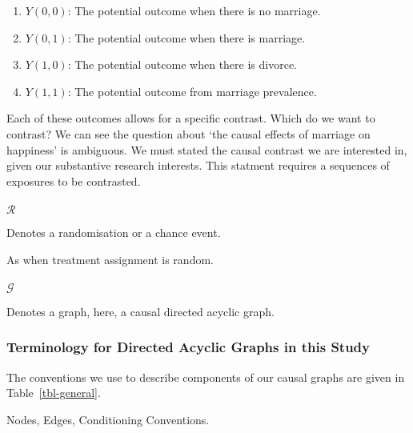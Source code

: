 \documentclass[
  single column]{article}
\makeatletter
\let\oldparagraph\paragraph
\renewcommand{\paragraph}{
    \@ifstar
      \xxxParagraphStar
      \xxxParagraphNoStar
  }
\newcommand{\xxxParagraphStar}[1]{\oldparagraph*{#1}\mbox{}}
\newcommand{\xxxParagraphNoStar}[1]{\oldparagraph{#1}\mbox{}}
\providecommand{\tightlist}{%
  \setlength{\itemsep}{0pt}\setlength{\parskip}{0pt}}\usepackage{longtable,booktabs,array}
\makeatother
\begin{document}
\begin{enumerate}
\def\labelenumi{\arabic{enumi}.}
\tightlist
\item
  \(Y(0, 0)\): The potential outcome when there is no marriage.
\item
  \(Y(0, 1)\): The potential outcome when there is marriage.
\item
  \(Y(1, 0)\): The potential outcome when there is divorce.
\item
  \(Y(1, 1)\): The potential outcome from marriage prevalence.
\end{enumerate}

Each of these outcomes allows for a specific contrast. Which do we want
to contrast? We can see the question about `the causal effects of
marriage on happiness' is ambiguous. We must stated the causal contrast
we are interested in, given our substantive research interests. This
statment requires a sequences of exposures to be contrasted.

\paragraph{\texorpdfstring{\(\mathcal{R}\)}{\textbackslash mathcal\{R\}}}\label{mathcalr}

Denotes a randomisation or a chance event.

As when treatment assignment is random.

\paragraph{\texorpdfstring{\(\mathcal{G}\)}{\textbackslash mathcal\{G\}}}\label{mathcalg}

Denotes a graph, here, a causal directed acyclic graph.

\subsubsection{Terminology for Directed Acyclic Graphs in this
Study}\label{terminology-for-directed-acyclic-graphs-in-this-study}

The conventions we use to describe components of our causal graphs are
given in Table~\ref{tbl-general}.

\begin{table}

\caption{\label{tbl-general}Nodes, Edges, Conditioning Conventions.}

\centering{

\terminologygeneraldags

}

\end{table}%
\end{document}
